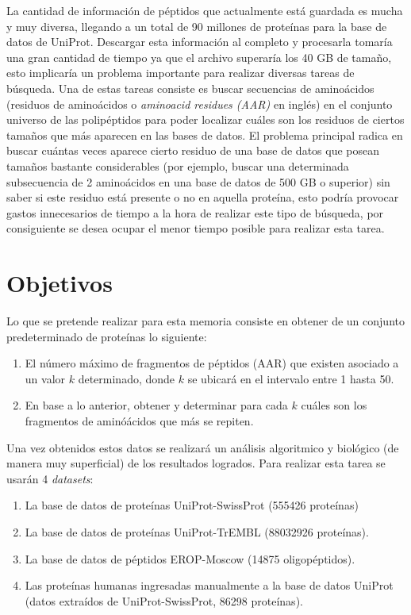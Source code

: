 La cantidad de información de péptidos que actualmente está guardada es mucha y muy diversa, llegando a un total de 90 millones de proteínas para la base de datos de UniProt. Descargar esta información al completo y procesarla tomaría una gran cantidad de tiempo ya que el archivo superaría los 40 GB de tamaño, esto implicaría un problema importante para realizar diversas tareas de búsqueda. Una de estas tareas consiste es buscar secuencias de aminoácidos (residuos de aminoácidos o \textit{aminoacid residues (AAR)} en inglés) en el conjunto universo de las polipéptidos para poder localizar cuáles son los residuos de ciertos tamaños que más aparecen en las bases de datos. El problema principal radica en buscar cuántas veces aparece cierto residuo de una base de datos que posean tamaños bastante considerables (por ejemplo, buscar una determinada subsecuencia de 2 aminoácidos en una base de datos de 500 GB o superior) sin saber si este residuo está presente o no en aquella proteína, esto podría provocar gastos innecesarios de tiempo a la hora de realizar este tipo de búsqueda, por consiguiente se desea ocupar el menor tiempo posible para realizar esta tarea.

\section{Objetivos}

Lo que se pretende realizar para esta memoria consiste en obtener de un conjunto predeterminado de proteínas lo siguiente:

\begin{enumerate}

\item El número máximo de fragmentos de péptidos (AAR) que existen asociado a un valor $k$ determinado, donde $k$ se ubicará en el intervalo entre 1 hasta 50.
\item En base a lo anterior, obtener y determinar para cada $k$ cuáles son los fragmentos de aminóácidos que más se repiten.

\end{enumerate}

Una vez obtenidos estos datos se realizará un análisis algoritmico y biológico (de manera muy superficial) de los resultados logrados. Para realizar esta tarea se usarán 4 \textit{datasets}:
 
\begin{enumerate}

\item La base de datos de proteínas UniProt-SwissProt \cite{swissprot} (555426 proteínas)
\item La base de datos de proteínas UniProt-TrEMBL \cite{trembl} (88032926 proteínas).
\item La base de datos de péptidos EROP-Moscow \cite{eropmoscow} (14875 oligopéptidos).
\item Las proteínas humanas ingresadas manualmente a la base de datos UniProt (datos extraídos de UniProt-SwissProt, 86298 proteínas).

\end{enumerate}
